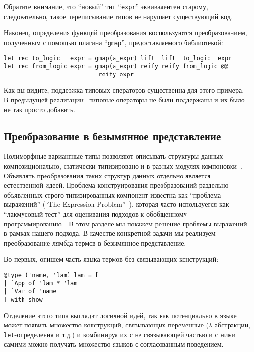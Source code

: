 Обратите внимание, что ``новый'' тип ``\lstinline{expr}'' эквивалентен старому, следовательно, такое переписывание типов не нарушает существующий код.

Наконец, определения функций преобразования воспользуются преобразованием, полученным с помощью плагина ``\lstinline{gmap}'', предоставляемого библиотекой:

\begin{lstlisting}
let rec to_logic   expr = gmap(a_expr) lift  lift  to_logic  expr
let rec from_logic expr = gmap(a_expr) reify reify from_logic @@ 
                           reify expr
\end{lstlisting}

Как вы видите, поддержка типовых операторов существенна для этого примера. В предыдущей реализации~\cite{TransformationObjects} типовые операторы не были поддержаны и их было не так просто добавить.

\subsection{Преобразование в безымянное представление}

Полиморфные вариантные типы позволяют описывать структуры данных композиционально, статически типизировано и в разных модулях 
компоновки~\cite{PolyVarReuse}.
Объявлять преобразования таких структур данных отдельно является естественной идеей. Проблема конструирования преобразований 
раздельно объявленных строго типизированных компонент известна как ``проблема выражений'' (``The Expression Problem''~\cite{ExpressionProblem}), которая часто используется как ``лакмусовый тест'' для оценивания подходов к обобщенному программированию~\cite{ObjectAlgebras,ALaCarte}. 
В этом разделе мы покажем решение проблемы выражений в рамках нашего подхода. В качестве конкретной задачи мы реализуем преобразование лямбда-термов в безымянное представление.

Во-первых, опишем часть языка термов без связывающих конструкций:

\begin{lstlisting}
@type ('name, 'lam) lam = [
| `App of 'lam * 'lam
| `Var of 'name
] with show
\end{lstlisting}

Отделение этого типа выглядит логичной идей, так как потенциально в языке может появить множество конструкций, связывающих переменные 
($\lambda$-абстракции, \lstinline=let=-определения и т.д.) и комбинируя их с не связывающей частью и с ними самими можно получать множество языков с согласованным поведением.

